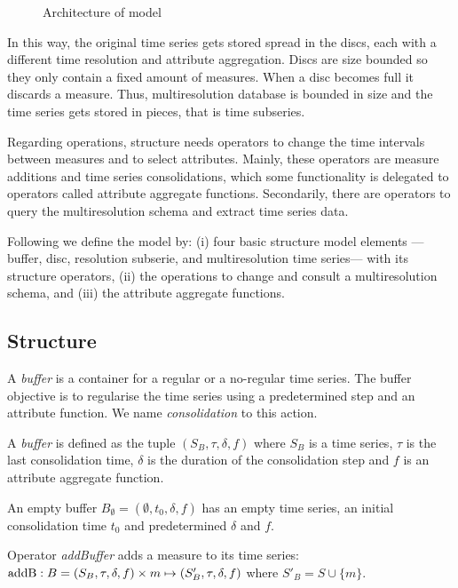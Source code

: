 \begin{figure}[tp]
  \centering
  
  \smallskip
  \caption{Architecture of  model}
  \label{fig:model:mtsdb}
\end{figure}


In this way, the original time series gets stored spread in the discs,
each with a different time resolution and attribute aggregation.
Discs are size bounded so they only contain a fixed amount of
measures. When a disc becomes full it discards a measure. Thus,
multiresolution database is bounded in size and the time series gets
stored in pieces, that is time subseries.

Regarding operations,  structure needs operators to change
the time intervals between measures and to select attributes. Mainly,
these operators are measure additions and time series consolidations,
which some functionality is delegated to operators called attribute
aggregate functions. Secondarily, there are operators to query the
multiresolution schema and extract time series data.


Following we define the  model by: (i) four basic
structure model elements ---buffer, disc, resolution subserie, and
multiresolution time series--- with its structure operators, (ii) the
operations to change and consult a multiresolution schema, and (iii)
the attribute aggregate functions.



\subsection{Structure}

A \emph{buffer} is a container for a regular or a no-regular time
series. The buffer objective is to regularise the time series using a
predetermined step and an attribute function. We name
\emph{consolidation} to this action.
\begin{definition}[Buffer]
  A \emph{buffer} is defined as the tuple $(S_B,\tau,\delta,f)$ where
  $S_B$ is a time series, $\tau$ is the last consolidation time,
  $\delta$ is the duration of the consolidation step and $f$ is an
  attribute aggregate function.

  An empty buffer $B_{\emptyset} = (\emptyset,t_0, \delta, f)$ has an
  empty time series, an initial consolidation time $t_0$ and
  predetermined $\delta$ and $f$.
\end{definition}

Operator \emph{addBuffer} adds a measure to its time series:
$\operatorname{addB}: B = (S_B,\tau,\delta,f) \times m \mapsto
(S'_B,\tau,\delta,f)$ where $S'_B = S \cup \{m\} $.


